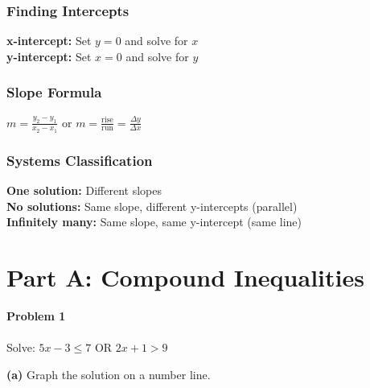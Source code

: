 \documentclass[12pt]{article}
\begin{document}
	        \subsubsection*{Finding Intercepts}
	    		\textbf{x-intercept:} Set $y = 0$ and solve for $x$ \\
                \textbf{y-intercept:} Set $x = 0$ and solve for $y$

            \subsubsection*{Slope Formula}
                $m = \displaystyle\frac{y_2 - y_1}{x_2 - x_1}$ \quad or \quad $m = \displaystyle\frac{\text{rise}}{\text{run}} = \displaystyle\frac{\Delta y}{\Delta x}$

            \subsubsection*{Systems Classification}
                \textbf{One solution:} Different slopes \\
                \textbf{No solutions:} Same slope, different y-intercepts (parallel) \\
                \textbf{Infinitely many:} Same slope, same y-intercept (same line)

            \newpage
	
        \section*{Part A: Compound Inequalities}

            \textbf{Problem 1}\\\\
            Solve: $5x - 3 \leq 7$ OR $2x + 1 > 9$

            \vspace{3cm}

            \textbf{(a)} Graph the solution on a number line.

            \vspace{0.5cm}

            \begin{center}
            \end{center}
\end{document}
